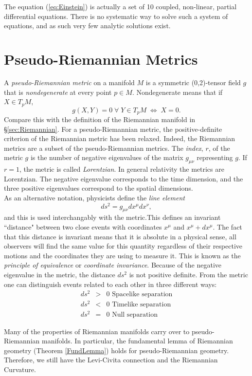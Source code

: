 The equation (\ref{eq:Einstein}) is actually a set of 10 coupled, non-linear, partial differential equations. There is no systematic way to solve such a system of equations, and as such very few analytic solutions exist. 
 
\section{Pseudo-Riemannian Metrics}\label{sec:Pseudo}
A \textit{pseudo-Riemannian metric} on a manifold $M$ is a symmetric (0,2)-tensor field $g$ that is \textit{nondegenerate} at every point $p\in M$. Nondegenerate means that if $X\in T_pM$,
\[ g(X,Y)=0\; \forall\; Y\in T_p M\; \Leftrightarrow\; X=0. \]
Compare this with the definition of the Riemannian manifold in {\S}\ref{sec:Riemannian}. For a pseudo-Riemannian metric, the positive-definite criterion of the Riemannian metric has been relaxed. Indeed, the Riemannian metrics are a subset of the pseudo-Riemannian metrics. The \textit{index}, $r$, of the metric $g$ is the number of negative eigenvalues of the matrix $g_{\mu \nu}$ representing $g$. If $r=1$, the metric is called \textit{Lorentzian}. In general relativity the metrics are Lorentzian. The negative eigenvalue corresponds to the time dimension, and the three positive eigenvalues correspond to the spatial dimensions.\\

As an alternative notation, physicists define the \textit{line element} 
\[ ds^2=g_{\mu \nu} dx^\mu dx^\nu, \]
and this is used interchangably with the metric.This defines an invariant ``distance" between two close events with coordinates $x^\mu$ and $x^\mu + dx^\mu$. The fact that this distance is invariant means that it is absolute in a physical sense, all observers will find the same value for this quantity regardless of their respective motions and the coordinates they are using to measure it. This is known as the \emph{principle of equivalence} or \emph{coordinate invariance}.  Because of the negative eigenvalue in the metric, the distance $ds^2$ is not positive definite. From the metric one can distinguish events related to each other in three different ways:
\begin{eqnarray*}
ds^2 & > & 0  \mbox{   Spacelike separation} \\
ds^2 & < & 0  \mbox{   Timelike separation} \\
ds^2 & = & 0  \mbox{   Null separation} 
\end{eqnarray*}

Many of the properties of Riemannian manifolds carry over to pseudo-Riemannian manifolds. In particular, the fundamental lemma of Riemannian geometry (Theorem \ref{FundLemma}) holds for pseudo-Riemannian geometry. Therefore, we still have the Levi-Civita connection and the Riemannian Curvature. \\

